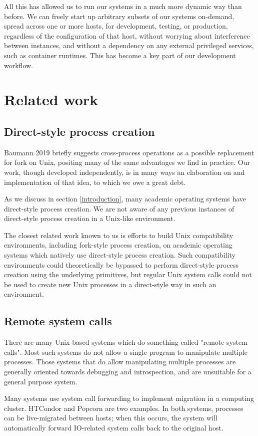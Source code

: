 \documentclass[letterpaper,twocolumn,10pt]{article}
\begin{document}
All this has allowed us to run our systems in a much more dynamic way than before.
We can freely start up arbitrary subsets of our systems on-demand,
spread across one or more hosts,
for development, testing, or production,
regardless of the configuration of that host,
without worrying about interference between instances,
and without a dependency on any external privileged services,
such as container runtimes.
This has become a key part of our development workflow.
\section{Related work}\label{related_work}
\subsection{Direct-style process creation}
Baumann 2019\cite{forkroad} briefly suggests cross-process operations as a possible replacement for fork on Unix,
positing many of the same advantages we find in practice.
Our work, though developed independently,
is in many ways an elaboration on and implementation of that idea,
to which we owe a great debt.

As we discuss in section \ref{introduction},
many academic operating systems have direct-style process creation.
We are not aware of any previous instances of direct-style process creation in a Unix-like environment.

The closest related work known to us
is efforts to build Unix compatibility environments, including fork-style process creation,
on academic operating systems which natively use direct-style process creation.\cite{exokernel}
Such compatibility environments could theoretically be bypassed to perform direct-style process creation
using the underlying primitives,
but regular Unix system calls could not be used to create new Unix processes in a direct-style way
in such an environment.
\subsection{Remote system calls}
There are many Unix-based systems which do something called "remote system calls".
Most such systems do not allow a single program to manipulate multiple processes.
Those systems that do allow manipulating multiple processes
are generally oriented towards debugging and introspection,
and are unsuitable for a general purpose system.

Many systems use system call forwarding to implement migration in a computing cluster.
HTCondor\cite{condor} and Popcorn\cite{popcorn} are two examples.
In both systems, processes can be live-migrated between hosts;
when this occurs, the system will automatically forward IO-related system calls
back to the original host.
\end{document}

